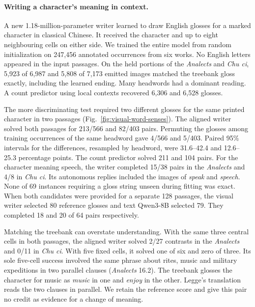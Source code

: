 \documentclass[12pt,a4paper]{article}
\providecommand{\DIFadd}[1]{{\protect\color{blue} \sf #1}} %
\begin{document}
\paragraph{\DIFadd{Writing a character's meaning in context.}}
\DIFadd{A new 1.18-million-parameter writer learned to draw English glosses for a marked character in classical Chinese. It received the character and up to eight neighbouring cells on either side. We trained the entire model from random initialization on 247,456 annotated occurrences from six works. No English letters appeared in the input passages. On the held portions of the \textit{Analects} and \textit{Chu ci}, 5,923 of 6,987 and 5,808 of 7,173 emitted images matched the treebank gloss exactly, including the learned ending. Many headwords had a dominant reading. A count predictor using local contexts recovered 6,306 and 6,528 glosses.
}

\DIFadd{The more discriminating test required two different glosses for the same printed character in two passages (Fig.~\ref{fig:visual-word-senses}). The aligned writer solved both passages for 213/566 and 82/403 pairs. Permuting the glosses among training occurrences of the same headword gave 4/566 and 5/403. Paired 95\% intervals for the differences, resampled by headword, were 31.6--42.4 and 12.6--25.3 percentage points. The count predictor solved 211 and 104 pairs. For the character meaning speech, the writer completed 15/38 pairs in the \textit{Analects} and 4/8 in \textit{Chu ci}. Its autonomous replies included the images of \textit{speak} and \textit{speech}. None of 69 instances requiring a gloss string unseen during fitting was exact. When both candidates were provided for a separate 128 passages, the visual writer selected 80 reference glosses and text Qwen3-8B selected 79. They completed 18 and 20 of 64 pairs respectively.
}

\DIFadd{Matching the treebank can overstate understanding. With the same three central cells in both passages, the aligned writer solved 2/27 contrasts in the \textit{Analects} and 0/11 in \textit{Chu ci}. With five fixed cells, it solved one of six and zero of three. Its sole five-cell success involved the same phrase about rites, music and military expeditions in two parallel clauses (\textit{Analects} 16.2). The treebank glosses the character for music as \textit{music} in one and \textit{enjoy} in the other. Legge's translation reads the two clauses in parallel. We retain the reference score and give this pair no credit as evidence for a change of meaning.
}
\end{document}
